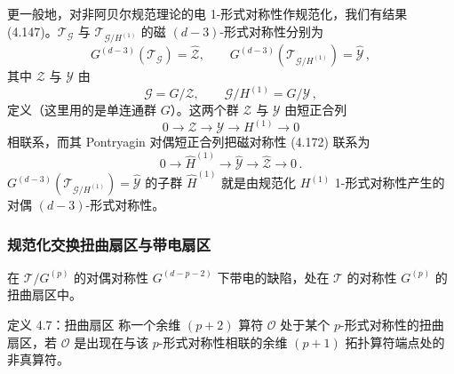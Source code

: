 更一般地，对非阿贝尔规范理论的电 1-形式对称性作规范化，我们有结果 (4.147)。$\mathcal{T}_{\mathcal{G}}$ 与 $\mathcal{T}_{\mathcal{G}/H^{(1)}}$ 的磁 $(d-3)$-形式对称性分别为
\begin{equation}
G^{(d-3)}(\mathcal{T}_{\mathcal{G}})=\widehat{\mathcal{Z}},\qquad G^{(d-3)}(\mathcal{T}_{\mathcal{G}/H^{(1)}})=\widehat{\mathcal{Y}}\,,
\tag{4.172}
\end{equation}
其中 $\mathcal{Z}$ 与 $\mathcal{Y}$ 由
\begin{equation}
\mathcal{G}=G/\mathcal{Z},\qquad \mathcal{G}/H^{(1)}=G/\mathcal{Y}\,,
\tag{4.173}
\end{equation}
定义（这里用的是单连通群 $G$）。这两个群 $\mathcal{Z}$ 与 $\mathcal{Y}$ 由短正合列
\begin{equation}
0\to\mathcal{Z}\to\mathcal{Y}\to H^{(1)}\to 0
\tag{4.174}
\end{equation}
相联系，而其 Pontryagin 对偶短正合列把磁对称性 (4.172) 联系为
\begin{equation}
0\to\widehat{H}^{(1)}\to\widehat{\mathcal{Y}}\to\widehat{\mathcal{Z}}\to 0\,.
\tag{4.175}
\end{equation}
$G^{(d-3)}(\mathcal{T}_{\mathcal{G}/H^{(1)}})=\widehat{\mathcal{Y}}$ 的子群 $\widehat{H}^{(1)}$ 就是由规范化 $H^{(1)}$ 1-形式对称性产生的对偶 $(d-3)$-形式对称性。


\subsubsection{规范化交换扭曲扇区与带电扇区}

在 $\mathcal{T}/G^{(p)}$ 的对偶对称性 $G^{(d-p-2)}$ 下带电的缺陷，处在 $\mathcal{T}$ 的对称性 $G^{(p)}$ 的扭曲扇区中。

\begin{definitionbox}{定义 4.7：扭曲扇区}
称一个余维 $(p+2)$ 算符 $\mathcal{O}$ 处于某个 $p$-形式对称性的扭曲扇区，若 $\mathcal{O}$ 是出现在与该 $p$-形式对称性相联的余维 $(p+1)$ 拓扑算符端点处的非真算符。
\end{definitionbox}

